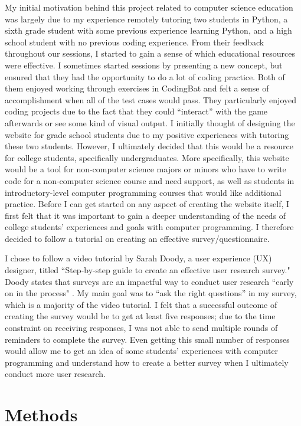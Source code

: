 \documentclass[10pt,twocolumn]{article}
\begin{document}
My initial motivation behind this project related to computer science education was largely due to my experience remotely tutoring two students in Python, a sixth grade student with some previous experience learning Python, and a high school student with no previous coding experience. From their feedback throughout our sessions, I started to gain a sense of which educational resources were effective. I sometimes started sessions by presenting a new concept, but ensured that they had the opportunity to do a lot of coding practice. Both of them enjoyed working through exercises in CodingBat and felt a sense of accomplishment when all of the test cases would pass. They particularly enjoyed coding projects due to the fact that they could “interact” with the game afterwards or see some kind of visual output. I initially thought of designing the website for grade school students due to my positive experiences with tutoring these two students. However, I ultimately decided that this would be a resource for college students, specifically undergraduates. More specifically, this website would be a tool for non-computer science majors or minors who have to write code for a non-computer science course and need support, as well as students in introductory-level computer programming courses that would like additional practice. Before I can get started on any aspect of creating the website itself, I first felt that it was important to gain a deeper understanding of the needs of college students’ experiences and goals with computer programming. I therefore decided to follow a tutorial on creating an effective survey/questionnaire.

I chose to follow a video tutorial by Sarah Doody, a user experience (UX) designer, titled “Step-by-step guide to create an effective user research survey." Doody states that surveys are an impactful way to conduct user research “early on in the process" \cite{Tutorial}. My main goal was to “ask the right questions” in my survey, which is a majority of the video tutorial. I felt that a successful outcome of creating the survey would be to get at least five responses; due to the time constraint on receiving responses, I was not able to send multiple rounds of reminders to complete the survey. Even getting this small number of responses would allow me to get an idea of some students’ experiences with computer programming and understand how to create a better survey when I ultimately conduct more user research.


\section{Methods}
\end{document}
